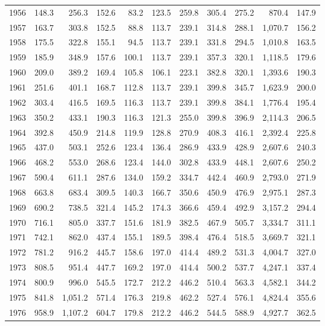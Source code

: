 \begin{longtable}{r*{10}{r}}
1956 & 148.3 & 256.3 & 152.6 & 83.2 & 123.5 & 259.8 & 305.4 & 275.2 & 870.4 & 147.9 \\
1957 & 163.7 & 303.8 & 152.5 & 88.8 & 113.7 & 239.1 & 314.8 & 288.1 & 1,070.7 & 156.2 \\
1958 & 175.5 & 322.8 & 155.1 & 94.5 & 113.7 & 239.1 & 331.8 & 294.5 & 1,010.8 & 163.5 \\
1959 & 185.9 & 348.9 & 157.6 & 100.1 & 113.7 & 239.1 & 357.3 & 320.1 & 1,118.5 & 179.6 \\
1960 & 209.0 & 389.2 & 169.4 & 105.8 & 106.1 & 223.1 & 382.8 & 320.1 & 1,393.6 & 190.3 \\
1961 & 251.6 & 401.1 & 168.7 & 112.8 & 113.7 & 239.1 & 399.8 & 345.7 & 1,623.9 & 200.0 \\
1962 & 303.4 & 416.5 & 169.5 & 116.3 & 113.7 & 239.1 & 399.8 & 384.1 & 1,776.4 & 195.4 \\
1963 & 350.2 & 433.1 & 190.3 & 116.3 & 121.3 & 255.0 & 399.8 & 396.9 & 2,114.3 & 206.5 \\
1964 & 392.8 & 450.9 & 214.8 & 119.9 & 128.8 & 270.9 & 408.3 & 416.1 & 2,392.4 & 225.8 \\
1965 & 437.0 & 503.1 & 252.6 & 123.4 & 136.4 & 286.9 & 433.9 & 428.9 & 2,607.6 & 240.3 \\
1966 & 468.2 & 553.0 & 268.6 & 123.4 & 144.0 & 302.8 & 433.9 & 448.1 & 2,607.6 & 250.2 \\
1967 & 590.4 & 611.1 & 287.6 & 134.0 & 159.2 & 334.7 & 442.4 & 460.9 & 2,793.0 & 271.9 \\
1968 & 663.8 & 683.4 & 309.5 & 140.3 & 166.7 & 350.6 & 450.9 & 476.9 & 2,975.1 & 287.3 \\
1969 & 690.2 & 738.5 & 321.4 & 145.2 & 174.3 & 366.6 & 459.4 & 492.9 & 3,157.2 & 294.4 \\
1970 & 716.1 & 805.0 & 337.7 & 151.6 & 181.9 & 382.5 & 467.9 & 505.7 & 3,334.7 & 311.1 \\
1971 & 742.1 & 862.0 & 437.4 & 155.1 & 189.5 & 398.4 & 476.4 & 518.5 & 3,669.7 & 321.1 \\
1972 & 781.2 & 916.2 & 445.7 & 158.6 & 197.0 & 414.4 & 489.2 & 531.3 & 4,004.7 & 327.0 \\
1973 & 808.5 & 951.4 & 447.7 & 169.2 & 197.0 & 414.4 & 500.2 & 537.7 & 4,247.1 & 337.4 \\
1974 & 800.9 & 996.0 & 545.5 & 172.7 & 212.2 & 446.2 & 510.4 & 563.3 & 4,582.1 & 344.2 \\
1975 & 841.8 & 1,051.2 & 571.4 & 176.3 & 219.8 & 462.2 & 527.4 & 576.1 & 4,824.4 & 355.6 \\
1976 & 958.9 & 1,107.2 & 604.7 & 179.8 & 212.2 & 446.2 & 544.5 & 588.9 & 4,927.7 & 362.5 \\

\end{longtable}
